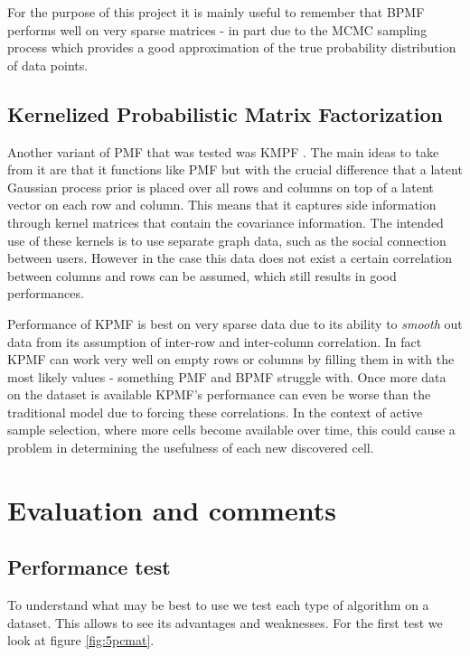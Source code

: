 For the purpose of this project it is mainly useful to remember that BPMF performs well on very sparse matrices - in  part due to the MCMC sampling process which provides a good approximation of the true probability distribution of data points.

\subsection{Kernelized Probabilistic Matrix Factorization}
Another variant of PMF that was tested was KMPF \cite{kpmf}. The main ideas to take from it are that it functions like PMF but with the crucial difference that a latent Gaussian process prior is placed over all rows and columns on top of a latent vector on each row and column. This means that it captures side information through kernel matrices that contain the covariance information. The intended use of these kernels is to use separate graph data, such as the social connection between users. However in the case this data does not exist a certain correlation between columns and rows can be assumed, which still results in good performances.

Performance of KPMF is best on very sparse data due to its ability to \textit{smooth} out data from its assumption of inter-row and inter-column correlation. In fact KPMF can work very well on empty rows or columns by filling them in with the most likely values - something PMF and BPMF struggle with.  Once more data on the dataset is available KPMF's performance can even be worse than the traditional model due to forcing these correlations. In the context of active sample selection, where more cells become available over time, this could cause a problem in determining the usefulness of each new discovered cell.
\section{Evaluation and comments}
\subsection{Performance test}

To understand what may be best to use we test each type of algorithm on a dataset. This allows to see its advantages and weaknesses. For the first test we look at figure \ref{fig:5pcmat}.

